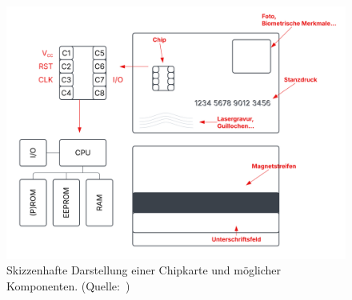 \begin{figure}
\centering
\includegraphics[scale=0.6]{aufgabe 1/img/chipkarte}
\caption{Skizzenhafte Darstellung einer Chipkarte und möglicher Komponenten. (Quelle:~\cite[\textbf{Abb. 2.1}, 9 sowie \textbf{Abb. 2.2}, 10]{ITS5})}
\label{fig:chipkarte}
\end{figure}
